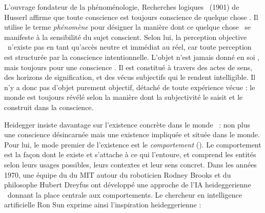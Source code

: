 L'ouvrage fondateur de la phénoménologie, \og Recherches logiques \fg\ (1901) de Husserl affirme que \og toute conscience est toujours conscience de quelque chose \fg. 
Il utilise le terme \emph{phénomène} pour désigner la manière dont ce \og quelque chose \fg\ se manifeste à la sensibilité du sujet conscient. 
Selon lui, la \og perception objective \fg\ n’existe pas en tant qu’accès neutre et immédiat au réel, car toute perception est structurée par la conscience intentionnelle. 
L'objet n’est jamais donné \og en soi \fg, mais toujours \og pour une conscience \fg.
Il est constitué à travers des actes de sens, des horizons de signification, et des vécus subjectifs qui le rendent intelligible. 
Il n’y a donc pas d’objet purement objectif, détaché de toute expérience vécue : 
le monde est toujours révélé selon la manière dont la subjectivité le saisit et le construit dans la conscience.

Heidegger insiste davantage sur l'existence concrète \og dans le monde \fg\ : non plus une conscience désincarnée mais une existence impliquée et située dans le monde. 
Pour lui, le mode premier de l'existence est le \emph{comportement} (). 
Le comportement est la façon dont le  existe et s'attache à ce qui l'entoure, et comprend les entités selon leurs usages possibles, leurs contextes et leur sens concret.
Dans les années 1970, une équipe du  du MIT autour du roboticien Rodney Brooks et du philosophe Hubert Dreyfus ont développé une approche de l'IA \og heideggerienne \fg\ donnant la place centrale aux comportements.
Le chercheur en intelligence artificielle Ron Sun exprime ainsi l'inspiration heideggerienne : 

\begin{quote}
	\cite[p.~361]{sun_desiderata_2004}
\end{quote}


